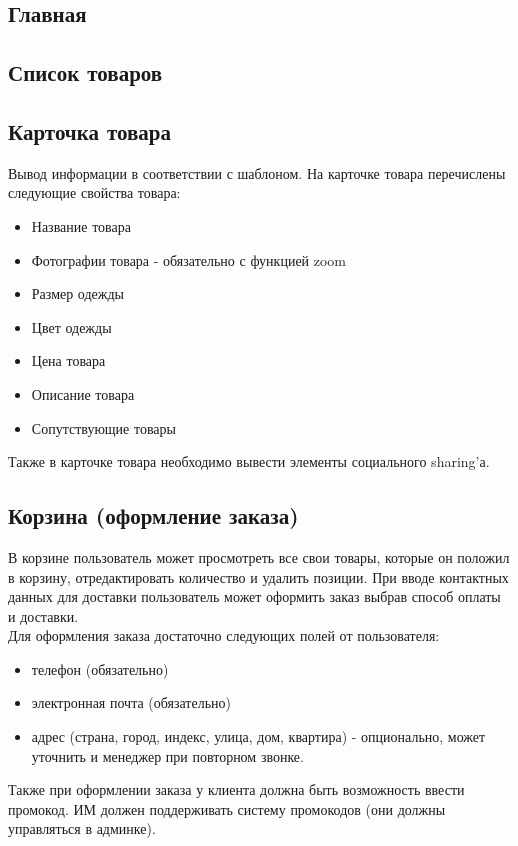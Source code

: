 \documentclass[DIV=calc, paper=a4, fontsize=11pt]{scrartcl} %
\begin{document}
\subsection{Главная}

\subsection{Список товаров}

\subsection{Карточка товара}
Вывод информации в соответствии с шаблоном. На карточке товара перечислены следующие свойства товара:

\begin{itemize}
	\item Название товара
	\item Фотографии товара - обязательно с функцией zoom
	\item Размер одежды
	\item Цвет одежды
	\item Цена товара
	\item Описание товара
	\item Сопутствующие товары
\end{itemize}

Также в карточке товара необходимо вывести элементы социального sharing'а.

\subsection{Корзина (оформление заказа)}
В корзине пользователь может просмотреть все свои товары, которые он положил в корзину, отредактировать количество и удалить позиции. При вводе контактных данных для доставки пользователь может оформить заказ выбрав способ оплаты и доставки.
\\[0.5cm]
Для оформления заказа достаточно следующих полей от пользователя:
\begin{itemize}
	\item телефон (обязательно)
	\item электронная почта (обязательно)
	\item адрес (страна, город, индекс, улица, дом, квартира) - опционально, может уточнить и менеджер при повторном звонке.
\end{itemize}

Также при оформлении заказа у клиента должна быть возможность ввести промокод. ИМ должен поддерживать систему промокодов (они должны управляться в админке).
\end{document}
